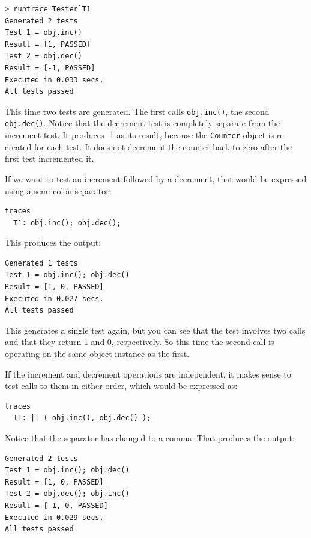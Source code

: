 \documentclass{overturerepchap}
\begin{document}
\lstset{style=tool,language=}
\begin{lstlisting}[escapechar=@]
> runtrace Tester`T1
Generated 2 tests
Test 1 = obj.inc()
Result = [1, PASSED]
Test 2 = obj.dec()
Result = [-1, PASSED]
Executed in 0.033 secs. 
All tests passed
\end{lstlisting}
\lstset{style=mystyle}
\lstset{language=VDM++}

\noindent This time two tests are generated. The first calls \texttt{obj.inc()}, the
second \texttt{obj.dec()}. Notice that the decrement test is completely separate
from the increment test. It produces -1 as its result, because the \texttt{Counter}
object is re-created for each test. It does not decrement the counter back to
zero after the first test incremented it.

If we want to test an increment followed by a decrement, that would be expressed
using a semi-colon separator:

\small
\begin{lstlisting}
traces
  T1: obj.inc(); obj.dec();
\end{lstlisting}
\normalsize

\noindent This produces the output:

\small
\lstset{style=tool,language=}
\begin{lstlisting}[escapechar=@]
Generated 1 tests
Test 1 = obj.inc(); obj.dec()
Result = [1, 0, PASSED]
Executed in 0.027 secs. 
All tests passed
\end{lstlisting}
\lstset{style=mystyle}
\lstset{language=VDM++}
\normalsize

\noindent This generates a single test again, but you can see that the test involves two
calls and that they return 1 and 0, respectively. So this time the second call
is operating on the same object instance as the first.

If the increment and decrement operations are independent, it makes sense to
test calls to them in either order, which would be expressed as:

\small
\begin{lstlisting}
traces
  T1: || ( obj.inc(), obj.dec() );
\end{lstlisting}
\normalsize

\noindent Notice that the separator has changed to a comma. That produces the output:

\small
\lstset{style=tool,language=}
\begin{lstlisting}[escapechar=@]
Generated 2 tests
Test 1 = obj.inc(); obj.dec()
Result = [1, 0, PASSED]
Test 2 = obj.dec(); obj.inc()
Result = [-1, 0, PASSED]
Executed in 0.029 secs. 
All tests passed
\end{lstlisting}
\lstset{style=mystyle}
\lstset{language=VDM++}
\normalsize
\end{document}
